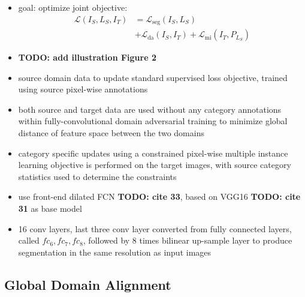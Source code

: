 \documentclass[]{article}
\newcommand{\todo}[1]{{\color{red}\bf{TODO: #1}}}
\begin{document}
\begin{itemize}
	\item goal: optimize joint objective:
	\begin{align}
		\mathcal{L}(I_S,L_S,I_T) &= \mathcal{L}_{\text{seg}}(I_S, L_S)\\
		&+ \mathcal{L}_{\text{da}}(I_S, I_T) + \mathcal{L}_{\text{mi}}(I_T,P_{L_S})
	\end{align}
	\item \todo{add illustration Figure 2}
	\item source domain data to update standard supervised loss objective, trained using source pixel-wise annotations
	\item both source and target data are used without any category annotations within fully-convolutional domain adversarial training to minimize global distance of feature space between the two domains
	\item category specific updates using a constrained pixel-wise multiple instance learning objective is performed on the target images, with source category statistics used to determine the constraints
	\item use front-end dilated FCN \todo{cite 33}, based on VGG16 \todo{cite 31} as base model
	\item 16 conv layers, last three conv layer converted from fully connected layers, called $f c_6, f c_7, f c_8$, followed by 8 times bilinear up-sample layer to produce segmentation in the same resolution as input images
\end{itemize}

\subsection{Global Domain Alignment}
\end{document}
